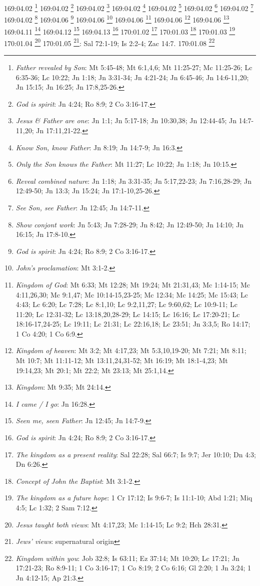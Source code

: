 {{{{{{{{{{{{{{{{{{{{{{{{{{{{{{{{{{{{{{{{{{{{{{{{{{{169:04.02 \footnote{\textit{Father revealed by Son}: Mt 5:45-48; Mt 6:1,4,6; Mt 11:25-27; Mc 11:25-26; Lc 6:35-36; Lc 10:22; Jn 1:18; Jn 3:31-34; Jn 4:21-24; Jn 6:45-46; Jn 14:6-11,20; Jn 15:15; Jn 16:25; Jn 17:8,25-26.}
169:04.02 \footnote{\textit{God is spirit}: Jn 4:24; Ro 8:9; 2 Co 3:16-17.}
169:04.02 \footnote{\textit{Jesus & Father are one}: Jn 1:1; Jn 5:17-18; Jn 10:30,38; Jn 12:44-45; Jn 14:7-11,20; Jn 17:11,21-22.}
169:04.02 \footnote{\textit{Know Son, know Father}: Jn 8:19; Jn 14:7-9; Jn 16:3.}
169:04.02 \footnote{\textit{Only the Son knows the Father}: Mt 11:27; Lc 10:22; Jn 1:18; Jn 10:15.}
169:04.02 \footnote{\textit{Reveal combined nature}: Jn 1:18; Jn 3:31-35; Jn 5:17,22-23; Jn 7:16,28-29; Jn 12:49-50; Jn 13:3; Jn 15:24; Jn 17:1-10,25-26.}
169:04.02 \footnote{\textit{See Son, see Father}: Jn 12:45; Jn 14:7-11.}
169:04.02 \footnote{\textit{Show conjont work}: Jn 5:43; Jn 7:28-29; Jn 8:42; Jn 12:49-50; Jn 14:10; Jn 16:15; Jn 17:8-10.}
169:04.06 \footnote{\textit{God is spirit}: Jn 4:24; Ro 8:9; 2 Co 3:16-17.}
169:04.06 \footnote{\textit{John's proclamation}: Mt 3:1-2.}
169:04.06 \footnote{\textit{Kingdom of God}: Mt 6:33; Mt 12:28; Mt 19:24; Mt 21:31,43; Mc 1:14-15; Mc 4:11,26,30; Mc 9:1,47; Mc 10:14-15,23-25; Mc 12:34; Mc 14:25; Mc 15:43; Lc 4:43; Lc 6:20; Lc 7:28; Lc 8:1,10; Lc 9:2,11,27; Lc 9:60,62; Lc 10:9-11; Lc 11:20; Lc 12:31-32; Lc 13:18,20,28-29; Lc 14:15; Lc 16:16; Lc 17:20-21; Lc 18:16-17,24-25; Lc 19:11; Lc 21:31; Lc 22:16,18; Lc 23:51; Jn 3:3,5; Ro 14:17; 1 Co 4:20; 1 Co 6:9.}
169:04.06 \footnote{\textit{Kingdom of heaven}: Mt 3:2; Mt 4:17,23; Mt 5:3,10,19-20; Mt 7:21; Mt 8:11; Mt 10:7; Mt 11:11-12; Mt 13:11,24,31-52; Mt 16:19; Mt 18:1-4,23; Mt 19:14,23; Mt 20:1; Mt 22:2; Mt 23:13; Mt 25:1,14.}
169:04.06 \footnote{\textit{Kingdom}: Mt 9:35; Mt 24:14.}
169:04.11 \footnote{\textit{I came / I go}: Jn 16:28.}
169:04.12 \footnote{\textit{Seen me, seen Father}: Jn 12:45; Jn 14:7-9.}
169:04.13 \footnote{\textit{God is spirit}: Jn 4:24; Ro 8:9; 2 Co 3:16-17.}
170:01.02 \footnote{\textit{The kingdom as a present reality}: Sal 22:28; Sal 66:7; Is 9:7; Jer 10:10; Dn 4:3; Dn 6:26.}
170:01.03 \footnote{\textit{Concept of John the Baptist}: Mt 3:1-2.}
170:01.03 \footnote{\textit{The kingdom as a future hope}: 1 Cr 17:12; Is 9:6-7; Is 11:1-10; Abd 1:21; Miq 4:5; Lc 1:32; 2 Sam 7:12.}
170:01.04 \footnote{\textit{Jesus taught both views}: Mt 4:17,23; Mc 1:14-15; Lc 9:2; Hch 28:31.}
170:01.05 \footnote{\textit{Jews' views}: supernatural origin}: Sal 72:1-19; Is 2:2-4; Zac 14:7.}
170:01.08 \footnote{\textit{Kingdom within you}: Job 32:8; Is 63:11; Ez 37:14; Mt 10:20; Lc 17:21; Jn 17:21-23; Ro 8:9-11; 1 Co 3:16-17; 1 Co 8:19; 2 Co 6:16; Gl 2:20; 1 Jn 3:24; 1 Jn 4:12-15; Ap 21:3.}
}}}}}}}}}}}}}}}}}}}}}}}}}}}}}}}}}}}}}}}}}}}}}}}}}}
